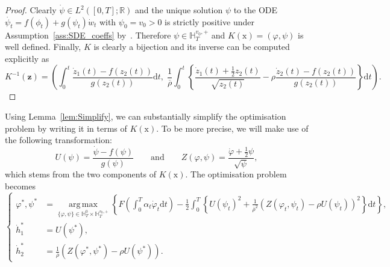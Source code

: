\documentclass{amsart}[11pt]
\numberwithin{equation}{section}
\numberwithin{theorem}{subsection}
\numberwithin{proposition}{subsection}
\numberwithin{definition}{subsection}
\numberwithin{lemma}{subsection}
\numberwithin{assumption}{subsection}
\newcommand{\HH}{\mathbb{H}}
\newcommand{\RR}{\mathbb{R}}
\newcommand{\brho}{\overline{\rho}}
\newcommand{\D}{\mathrm{d}}
\newcommand{\xx}{\boldsymbol{\mathrm{x}}}
\DeclareMathOperator*{\argmax}{arg\,max}
\begin{document}
\begin{proof}
Clearly $\dot{\psi}\in L^{2}\left([0, T]; \RR\right)$ and the unique solution $\psi$ to the ODE $\dot{\psi_t}=f(\phi_t)+g(\psi_t)\dot{w}_t$ with $\psi_0 = v_0 > 0$ is strictly positive under Assumption~\ref{ass:SDE_coeffs} by~\cite[Proposition 3.11]{Baldi2011}. Therefore $\psi\in\HH_T^{v_0, +}$ and $K(\xx)=(\varphi, \psi)$ is well defined.
Finally, $K$ is clearly a bijection and its inverse can be computed explicitly as
\[
K^{-1}(\mathbf z) = \left(\int_0^t \frac{\dot{z}_1(t)-f(z_2(t))}{g(z_2(t))}\D t,\; \frac1\brho\int_0^t\left\{ \frac{\dot{z}_1(t) + \frac{1}{2}z_2(t)}{\sqrt{z_2(t)}} - \rho\frac{\dot{z}_2(t)-f(z_2(t))}{g(z_2(t))} \right\} \D t\right).
\]
\end{proof}
Using Lemma~\ref{lem:Simplify}, we can substantially simplify the optimisation problem by writing it in terms of $K(\xx)$. To be more precise, we will make use of the following transformation:
\begin{equation}\label{eq:transformation_UZ}
U(\psi) = \frac{\dot{\psi} - f(\psi)}{g(\psi)}
\qquad\text{and}\qquad
Z(\varphi,\psi) = \frac{\dot{\varphi} + \frac{1}{2}\psi}{\sqrt{\psi}},
\end{equation}
which stems from the two components of $K(\xx)$. The optimisation problem becomes
\begin{equation*}
\left\{
\begin{array}{rl}
\varphi^{*},\psi^{*} & = \displaystyle\argmax\limits_{\{\varphi,\psi\} \in \HH_T^0\times \HH_T^{v_0,+}} \left\{F\left(\int_0^T\alpha_t \dot{\varphi}_t \D t\right) - \frac{1}{2}\int_0^T \left\{U(\psi_t)^2 + \frac{1}{\brho^2}(Z(\varphi_t,\psi_t) - \rho U(\psi_t))^2\right\}\D t\right\},\\
\dot{h}_1^{*} & = U(\psi^{*}), \\
\dot{h}_2^{*} & = \displaystyle \frac{1}{\brho}(Z(\varphi^{*},\psi^{*}) - \rho U(\psi^{*})).
\end{array}
\right.
\end{equation*}
\end{document}
